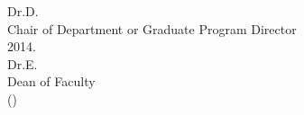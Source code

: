 \documentclass[11pt, a4paper, oneside]{Thesis} %
\begin{document}
    \hspace*{79pt}Dr.\@ D. \\
    \hspace*{79pt}Chair of Department or Graduate Program Director\\[6ex]
    \underline{\hspace*{100pt}} \hspace{10pt}  2014. \hspace{48pt} \underline{\hspace{200pt}}\\
    \hspace*{200pt}Dr.\@ E. \\
    \hspace*{200pt}Dean of Faculty\\    
    \hspace*{200pt}(\deptname)



\end{document}
